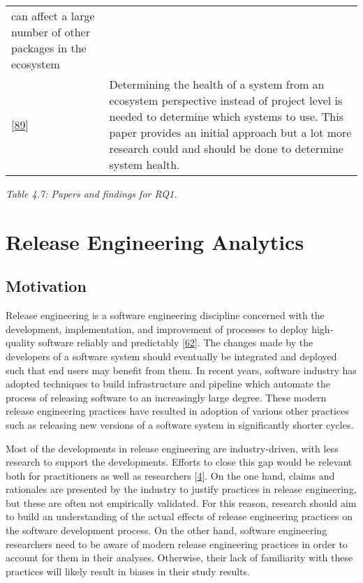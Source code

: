 \documentclass[]{book}
\begin{document}
\begin{longtable}[]{@{}ll@{}}
\begin{minipage}[t]{0.29\columnwidth}
can affect a large number of other packages in the ecosystem\strut
\end{minipage}\tabularnewline
\begin{minipage}[t]{0.13\columnwidth}\raggedright\strut
{[}\protect\hyperlink{ref-Jansen2014}{89}{]}\strut
\end{minipage} & \begin{minipage}[t]{0.29\columnwidth}\raggedright\strut
Determining the health of a system from an ecosystem perspective instead
of project level is needed to determine which systems to use. This paper
provides an initial approach but a lot more research could and should be
done to determine system health.\strut
\end{minipage}\tabularnewline
\bottomrule
\end{longtable}

\emph{Table 4.7: Papers and findings for RQ1.}

\chapter{Release Engineering
Analytics}\label{release-engineering-analytics}

\section{Motivation}\label{motivation-4}

Release engineering is a software engineering discipline concerned with
the development, implementation, and improvement of processes to deploy
high-quality software reliably and predictably
{[}\protect\hyperlink{ref-dyck2015a}{62}{]}. The changes made by the
developers of a software system should eventually be integrated and
deployed such that end users may benefit from them. In recent years,
software industry has adopted techniques to build infrastructure and
pipeline which automate the process of releasing software to an
increasingly large degree. These modern release engineering practices
have resulted in adoption of various other practices such as releasing
new versions of a software system in significantly shorter cycles.

Most of the developments in release engineering are industry-driven,
with less research to support the developments. Efforts to close this
gap would be relevant both for practitioners as well as researchers
{[}\protect\hyperlink{ref-adams2016a}{4}{]}. On the one hand, claims and
rationales are presented by the industry to justify practices in release
engineering, but these are often not empirically validated. For this
reason, research should aim to build an understanding of the actual
effects of release engineering practices on the software development
process. On the other hand, software engineering researchers need to be
aware of modern release engineering practices in order to account for
them in their analyses. Otherwise, their lack of familiarity with these
practices will likely result in biases in their study results.
\end{document}
